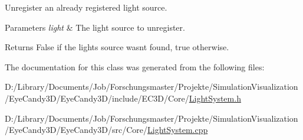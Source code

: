 Unregister an already registered light source. 


\begin{DoxyParams}{Parameters}
{\em light} & The light source to unregister. \\
\hline
\end{DoxyParams}
\begin{DoxyReturn}{Returns}
False if the lights source wasn\textquotesingle{}t found, true otherwise. 
\end{DoxyReturn}


The documentation for this class was generated from the following files\+:\begin{DoxyCompactItemize}
\item 
D\+:/\+Library/\+Documents/\+Job/\+Forschungsmaster/\+Projekte/\+Simulation\+Visualization/\+Eye\+Candy3\+D/\+Eye\+Candy3\+D/include/\+E\+C3\+D/\+Core/\mbox{\hyperlink{_light_system_8h}{Light\+System.\+h}}\item 
D\+:/\+Library/\+Documents/\+Job/\+Forschungsmaster/\+Projekte/\+Simulation\+Visualization/\+Eye\+Candy3\+D/\+Eye\+Candy3\+D/src/\+Core/\mbox{\hyperlink{_light_system_8cpp}{Light\+System.\+cpp}}\end{DoxyCompactItemize}
